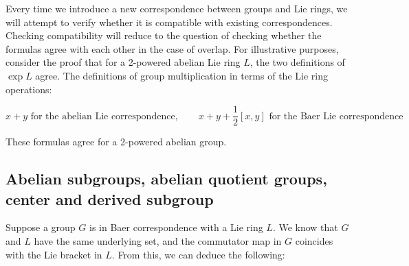 Every time we introduce a new correspondence between groups and Lie
rings, we will attempt to verify whether it is compatible with
existing correspondences. Checking compatibility will reduce to the
question of checking whether the formulas agree with each other in the
case of overlap. For illustrative purposes, consider the proof that
for a 2-powered abelian Lie ring $L$, the two definitions of $\exp L$
agree. The definitions of group multiplication in terms of the Lie
ring operations:

$$x + y \text{ for the abelian Lie correspondence}, \qquad x + y + \frac{1}{2}[x,y] \text{ for the Baer Lie correspondence}$$

These formulas agree for a 2-powered abelian group.

\subsection{Abelian subgroups, abelian quotient groups, center and derived subgroup}\label{sec:baer-correspondence-center-and-derived}

Suppose a group $G$ is in Baer correspondence with a Lie ring $L$. We
know that $G$ and $L$ have the same underlying set, and the commutator
map in $G$ coincides with the Lie bracket in $L$. From this, we can
deduce the following:

